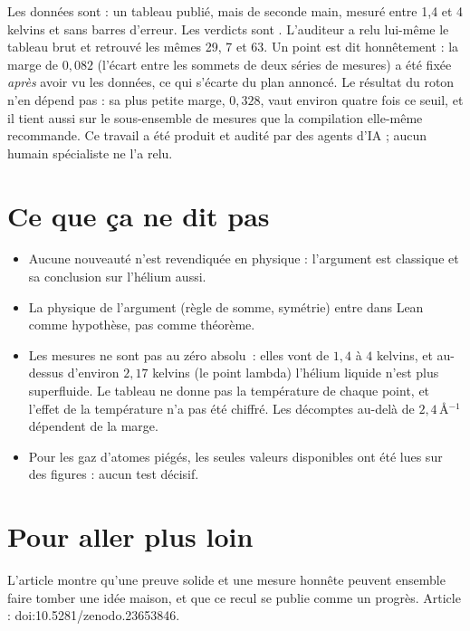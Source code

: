 Les données sont  : un tableau publié, mais de seconde main, mesuré entre 1,4 et 4 kelvins et sans barres
d'erreur. Les verdicts sont . L'auditeur a relu lui-même le tableau brut et retrouvé les mêmes 29, 7 et 63.
Un point est dit honnêtement : la marge de $0{,}082$ (l'écart entre les sommets de deux séries de mesures) a été
fixée \emph{après} avoir vu les données, ce qui s'écarte du plan annoncé. Le résultat du roton n'en dépend pas : sa plus
petite marge, $0{,}328$, vaut environ quatre fois ce seuil, et il tient aussi sur le sous-ensemble de mesures que la
compilation elle-même recommande. Ce travail a été produit et audité par des agents d'IA ; aucun humain spécialiste ne
l'a relu.

\section*{Ce que ça ne dit pas}

\begin{limite}
\begin{itemize}
\item Aucune nouveauté n'est revendiquée en physique : l'argument est classique et sa conclusion sur l'hélium aussi.
\item La physique de l'argument (règle de somme, symétrie) entre dans Lean comme hypothèse, pas comme théorème.
\item Les mesures ne sont pas au zéro absolu~: elles vont de $1{,}4$ à $4$ kelvins, et au-dessus d'environ
  $2{,}17$ kelvins (le point lambda) l'hélium liquide n'est plus superfluide. Le tableau ne donne pas la température
  de chaque point, et l'effet de la température n'a pas été chiffré. Les décomptes au-delà de $2{,}4$\,Å$^{-1}$
  dépendent de la marge.
\item Pour les gaz d'atomes piégés, les seules valeurs disponibles ont été lues sur des figures : aucun test décisif.
\end{itemize}
\end{limite}

\section*{Pour aller plus loin}

L'article montre qu'une preuve solide et une mesure honnête peuvent ensemble faire tomber une idée maison, et que ce
recul se publie comme un progrès. Article : doi:10.5281/zenodo.23653846.

